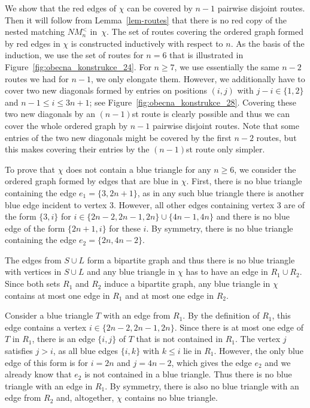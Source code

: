 \documentclass[11pt,a4paper]{article}
\theoremstyle{remark}
\begin{document}
We show that the red edges of $\chi$ can be covered by $n-1$ pairwise disjoint routes.
Then it will follow from Lemma~\ref{lem-routes} that there is no red copy of the nested matching $NM^<_n$ in~$\chi$.
The set of routes covering the ordered graph formed by red edges in $\chi$ is constructed inductively with respect to $n$.
As the basis of the induction, we use the set of routes for $n=6$ that is illustrated in Figure~\ref{fig:obecna_konstrukce_24}.
For $n \geq 7$, we use essentially the same $n-2$ routes we had for $n-1$, we only elongate them. 
However, we additionally have to cover two new diagonals formed by entries on positions $(i,j)$ with $j-i \in \{1,2\}$ and $n-1 \leq i \leq 3n+1$; see Figure~\ref{fig:obecna_konstrukce_28}.
Covering these two new diagonals by an $(n-1)$st route is clearly possible and thus we can cover the whole ordered graph by $n-1$ pairwise disjoint routes.
Note that some entries of the two new diagonals might be covered by the first $n-2$ routes, but this makes covering their entries by the $(n-1)$st route only simpler.

To prove that $\chi$ does not contain a blue triangle for any $n\geq 6$, we consider the ordered graph formed by edges that are blue in $\chi$.
First, there is no blue triangle containing the edge $e_1=\{3,2n+1\}$, as in any such blue triangle there is another blue edge incident to vertex 3.
However, all other edges containing vertex 3 are of the form $\{3,i\}$ for $i \in \{2n-2,2n-1,2n\}\cup \{4n-1,4n\}$ and there is no blue edge of the form $\{2n+1,i\}$ for these $i$.
By symmetry, there is no blue triangle containing the edge $e_2=\{2n,4n-2\}$.

The edges from $S\cup L$ form a bipartite graph and thus there is no blue triangle with vertices in $S\cup L$ and any blue triangle in $\chi$ has to have an edge in $R_1 \cup R_2$.
Since both sets $R_1$ and $R_2$ induce a bipartite graph, any blue triangle in $\chi$ contains at most one edge in $R_1$ and at most one edge in $R_2$.

Consider a blue triangle $T$ with an edge from $R_1$.
By the definition of $R_1$, this edge contains a vertex $i \in \{2n-2,2n-1,2n\}$.
Since there is at most one edge of $T$ in $R_1$, there is an edge $\{i,j\}$ of $T$ that is not contained in $R_1$.
The vertex $j$ satisfies $j > i$, as all blue edges $\{i,k\}$ with $k \leq i$ lie in $R_1$.
However, the only blue edge of this form is for $i=2n$ and $j=4n-2$, which gives the edge $e_2$ and we already know that $e_2$ is not contained in a blue triangle.
Thus there is no blue triangle with an edge in $R_1$.
By symmetry, there is also no blue triangle with an edge from $R_2$ and, altogether, $\chi$ contains no blue triangle.
\end{document}
